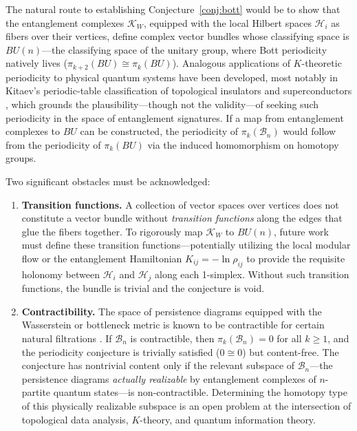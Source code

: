 \documentclass[12pt, a4paper]{article}
\begin{document}
The natural route to establishing Conjecture~\ref{conj:bott} would be to show that the entanglement complexes $\mathcal{K}_W$, equipped with the local Hilbert spaces $\mathcal{H}_i$ as fibers over their vertices, define complex vector bundles whose classifying space is $BU(n)$---the classifying space of the unitary group, where Bott periodicity natively lives ($\pi_{k+2}(BU) \cong \pi_k(BU)$). Analogous applications of $K$-theoretic periodicity to physical quantum systems have been developed, most notably in Kitaev's periodic-table classification of topological insulators and superconductors \cite{Kitaev2009}, which grounds the plausibility---though not the validity---of seeking such periodicity in the space of entanglement signatures. If a map from entanglement complexes to $BU$ can be constructed, the periodicity of $\pi_k(\mathcal{B}_n)$ would follow from the periodicity of $\pi_k(BU)$ via the induced homomorphism on homotopy groups.

Two significant obstacles must be acknowledged:

\begin{enumerate}
    \item \textbf{Transition functions.} A collection of vector spaces over vertices does not constitute a vector bundle without \emph{transition functions} along the edges that glue the fibers together. To rigorously map $\mathcal{K}_W$ to $BU(n)$, future work must define these transition functions---potentially utilizing the local modular flow or the entanglement Hamiltonian $K_{ij} = -\ln \rho_{ij}$ to provide the requisite holonomy between $\mathcal{H}_i$ and $\mathcal{H}_j$ along each 1-simplex. Without such transition functions, the bundle is trivial and the conjecture is void.
    
    \item \textbf{Contractibility.} The space of persistence diagrams equipped with the Wasserstein or bottleneck metric is known to be contractible for certain natural filtrations \cite{Mileyko2011}. If $\mathcal{B}_n$ is contractible, then $\pi_k(\mathcal{B}_n) = 0$ for all $k \geq 1$, and the periodicity conjecture is trivially satisfied ($0 \cong 0$) but content-free. The conjecture has nontrivial content only if the relevant subspace of $\mathcal{B}_n$---the persistence diagrams \emph{actually realizable} by entanglement complexes of $n$-partite quantum states---is non-contractible. Determining the homotopy type of this physically realizable subspace is an open problem at the intersection of topological data analysis, $K$-theory, and quantum information theory.
\end{enumerate}
\end{document}
